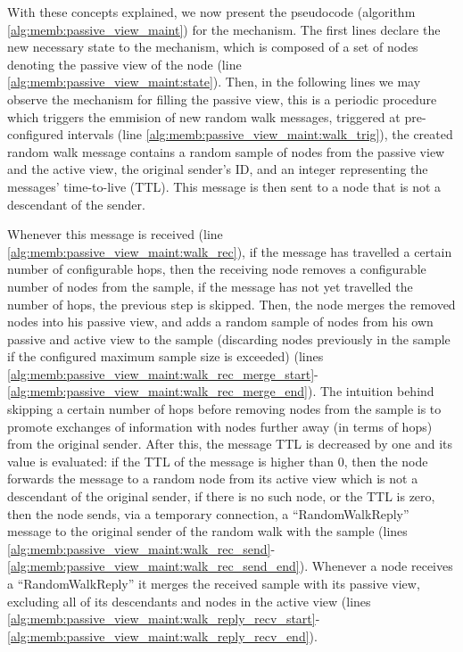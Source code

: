 With these concepts explained, we now present the pseudocode (algorithm \ref{alg:memb:passive_view_maint}) for the mechanism. The first lines declare the new necessary state to the mechanism, which is composed of a set of nodes denoting the passive view of the node (line \ref{alg:memb:passive_view_maint:state}). Then, in the following lines we may observe the mechanism for filling the passive view, this is a periodic procedure which triggers the emmision of new random walk messages, triggered at pre-configured intervals (line \ref{alg:memb:passive_view_maint:walk_trig}), the created random walk message contains a random sample of nodes from the passive view and the active view, the original sender's ID, and an integer representing the messages' time-to-live (TTL). This message is then sent to a node that is not a descendant of the sender.



Whenever this message is received (line \ref{alg:memb:passive_view_maint:walk_rec}), if the message has travelled a certain number of configurable hops, then the receiving node removes a configurable number of nodes from the sample, if the message has not yet travelled the number of hops, the previous step is skipped. Then, the node merges the removed nodes into his passive view, and adds a random sample of nodes from his own passive and active view to the sample (discarding nodes previously in the sample if the configured maximum sample size is exceeded) (lines \ref{alg:memb:passive_view_maint:walk_rec_merge_start}-\ref{alg:memb:passive_view_maint:walk_rec_merge_end}). The intuition behind skipping a certain number of hops before removing nodes from the sample is to promote exchanges of information with nodes further away (in terms of hops) from the original sender. After this, the message TTL is decreased by one and its value is evaluated: if the TTL of the message is higher than 0, then the node forwards the message to a random node from its active view which is not a descendant of the original sender, if there is no such node, or the TTL is zero, then the node sends, via a temporary connection, a ``RandomWalkReply'' message to the original sender of the random walk with the sample (lines \ref{alg:memb:passive_view_maint:walk_rec_send}-\ref{alg:memb:passive_view_maint:walk_rec_send_end}). Whenever a node receives a ``RandomWalkReply'' it merges the received sample with its passive view, excluding all of its descendants and nodes in the active view (lines \ref{alg:memb:passive_view_maint:walk_reply_recv_start}-\ref{alg:memb:passive_view_maint:walk_reply_recv_end}).

